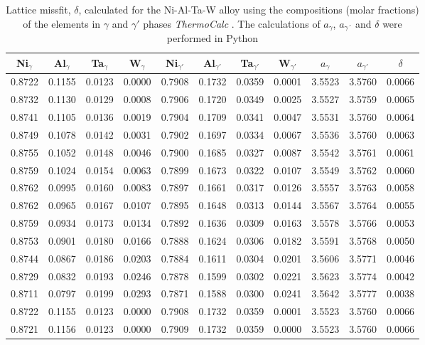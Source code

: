 \begin{table}[H]
    \centering
    \begin{tabular}{rrrrrrrrrrr}
        \multicolumn{1}{c}{Ni$_\gamma$} & \multicolumn{1}{c}{Al$_\gamma$} & \multicolumn{1}{c}{Ta$_\gamma$} & \multicolumn{1}{c}{W$_\gamma$} & \multicolumn{1}{c}{Ni$_{\gamma'}$} & \multicolumn{1}{c}{Al$_{\gamma'}$} & \multicolumn{1}{c}{Ta$_{\gamma'}$} & \multicolumn{1}{c}{W$_{\gamma'}$} & \multicolumn{1}{c}{$a_\gamma$} & \multicolumn{1}{c}{$a_{\gamma'}$} & \multicolumn{1}{c}{$\delta$} \\ \hline \hline
        0.8722 & 0.1155 & 0.0123 & 0.0000 & 0.7908 & 0.1732 & 0.0359 & 0.0001 & 3.5523 & 3.5760 & 0.0066 \\0.8732 & 0.1130 & 0.0129 & 0.0008 & 0.7906 & 0.1720 & 0.0349 & 0.0025 & 3.5527 & 3.5759 & 0.0065 \\0.8741 & 0.1105 & 0.0136 & 0.0019 & 0.7904 & 0.1709 & 0.0341 & 0.0047 & 3.5531 & 3.5760 & 0.0064 \\0.8749 & 0.1078 & 0.0142 & 0.0031 & 0.7902 & 0.1697 & 0.0334 & 0.0067 & 3.5536 & 3.5760 & 0.0063 \\0.8755 & 0.1052 & 0.0148 & 0.0046 & 0.7900 & 0.1685 & 0.0327 & 0.0087 & 3.5542 & 3.5761 & 0.0061 \\0.8759 & 0.1024 & 0.0154 & 0.0063 & 0.7899 & 0.1673 & 0.0322 & 0.0107 & 3.5549 & 3.5762 & 0.0060 \\0.8762 & 0.0995 & 0.0160 & 0.0083 & 0.7897 & 0.1661 & 0.0317 & 0.0126 & 3.5557 & 3.5763 & 0.0058 \\0.8762 & 0.0965 & 0.0167 & 0.0107 & 0.7895 & 0.1648 & 0.0313 & 0.0144 & 3.5567 & 3.5764 & 0.0055 \\0.8759 & 0.0934 & 0.0173 & 0.0134 & 0.7892 & 0.1636 & 0.0309 & 0.0163 & 3.5578 & 3.5766 & 0.0053 \\0.8753 & 0.0901 & 0.0180 & 0.0166 & 0.7888 & 0.1624 & 0.0306 & 0.0182 & 3.5591 & 3.5768 & 0.0050 \\0.8744 & 0.0867 & 0.0186 & 0.0203 & 0.7884 & 0.1611 & 0.0304 & 0.0201 & 3.5606 & 3.5771 & 0.0046 \\0.8729 & 0.0832 & 0.0193 & 0.0246 & 0.7878 & 0.1599 & 0.0302 & 0.0221 & 3.5623 & 3.5774 & 0.0042 \\0.8711 & 0.0797 & 0.0199 & 0.0293 & 0.7871 & 0.1588 & 0.0300 & 0.0241 & 3.5642 & 3.5777 & 0.0038 \\0.8722 & 0.1155 & 0.0123 & 0.0000 & 0.7908 & 0.1732 & 0.0359 & 0.0001 & 3.5523 & 3.5760 & 0.0066 \\0.8721 & 0.1156 & 0.0123 & 0.0000 & 0.7909 & 0.1732 & 0.0359 & 0.0000 & 3.5523 & 3.5760 & 0.0066
    \end{tabular}
    \caption{Lattice missfit, $\delta$, calculated for the Ni-Al-Ta-W alloy using the compositions (molar fractions) of the elements in $\gamma$ and $\gamma'$ phases  \textit{ThermoCalc} \citep{thermocalc}. The calculations of $a_\gamma$, $a_{\gamma´}$ and $\delta$ were performed in Python \citep{mygit}}
    \label{tab:tab07}
\end{table}